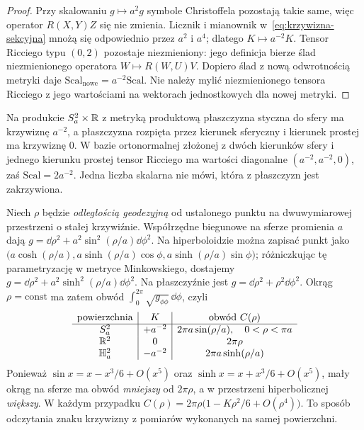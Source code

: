 \begin{proof}
Przy skalowaniu $g\mapsto a^2g$ symbole
Christoffela pozostają takie same, więc operator
$R(X,Y)Z$ się nie zmienia. Licznik i mianownik
w~\eqref{eq:krzywizna-sekcyjna} mnożą się
odpowiednio przez $a^2$ i $a^4$; dlatego
$K\mapsto a^{-2}K$. Tensor Ricciego typu $(0,2)$
pozostaje niezmieniony: jego definicja bierze ślad
niezmienionego operatora $W\mapsto R(W,U)V$.
Dopiero ślad z nową odwrotnością metryki daje
$\mathrm{Scal}_{\mathrm{nowe}}=a^{-2}\mathrm{Scal}$.
Nie należy mylić niezmienionego tensora Ricciego
z jego wartościami na wektorach jednostkowych dla nowej metryki.
\end{proof}

\begin{przyklad}
Na produkcie $S_a^2\times\mathbb{R}$ z metryką produktową
płaszczyzna styczna do sfery ma krzywiznę $a^{-2}$,
a płaszczyzna rozpięta przez kierunek sferyczny
i kierunek prostej ma krzywiznę $0$. W bazie
ortonormalnej złożonej z dwóch kierunków sfery
i jednego kierunku prostej tensor Ricciego ma
wartości diagonalne $(a^{-2},a^{-2},0)$,
zaś $\mathrm{Scal}=2a^{-2}$. Jedna liczba skalarna
nie mówi, która z płaszczyzn jest zakrzywiona.
\end{przyklad}

\begin{przyklad}
\label{prz:obwod-kola-krzywizna}
Niech $\rho$ będzie \emph{odległością geodezyjną}
od ustalonego punktu na dwuwymiarowej przestrzeni
o stałej krzywiźnie. Współrzędne biegunowe na
sferze promienia $a$ dają
$g=\dd\rho^2+a^2\sin^2(\rho/a)\dd\phi^2$.
Na hiperboloidzie można zapisać punkt jako
$\bigl(a\cosh(\rho/a),
 a\sinh(\rho/a)\cos\phi,
 a\sinh(\rho/a)\sin\phi\bigr)$;
różniczkując tę parametryzację w metryce
Minkowskiego, dostajemy
$g=\dd\rho^2+a^2\sinh^2(\rho/a)\dd\phi^2$.
Na płaszczyźnie jest $g=\dd\rho^2+\rho^2\dd\phi^2$.
Okrąg $\rho=\mathrm{const}$ ma zatem obwód
$\int_0^{2\pi}\sqrt{g_{\phi\phi}}\,\dd\phi$, czyli
\begin{equation}\label{eq:obwod-kola-krzywizna}
 \begin{array}{c|c|c}
  \text{powierzchnia}& K & \text{obwód }C(\rho)\\ \hline
  S_a^2&+a^{-2}&2\pi a\sin(\rho/a),\quad 0<\rho<\pi a\\
  \mathbb{R}^2&0&2\pi\rho\\
  \mathbb H_a^2&-a^{-2}&2\pi a\sinh(\rho/a)
 \end{array}
\end{equation}
Ponieważ $\sin x=x-x^3/6+O(x^5)$ oraz
$\sinh x=x+x^3/6+O(x^5)$, mały okrąg na
sferze ma obwód \emph{mniejszy} od $2\pi\rho$,
a w przestrzeni hiperbolicznej \emph{większy}.
W każdym przypadku $C(\rho)=2\pi\rho
\bigl(1-K\rho^2/6+O(\rho^4)\bigr)$.
To sposób odczytania znaku krzywizny z pomiarów
wykonanych na samej powierzchni.
\end{przyklad}

